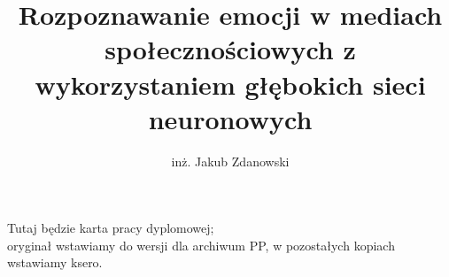 \documentclass[polish,a4paper,oneside]{ppfcmthesis}
\author{%
   inż. Jakub Zdanowski \album{127239}
}
\title{Rozpoznawanie emocji w mediach społecznościowych z wykorzystaniem głębokich sieci neuronowych}
\begin{document}
\frontmatter\pagestyle{empty}%
\maketitle\cleardoublepage%


\thispagestyle{empty}\vspace*{\fill}%
\begin{center}Tutaj będzie karta pracy dyplomowej;\\oryginał wstawiamy do wersji dla archiwum PP, w pozostałych kopiach wstawiamy ksero.\end{center}%
\vfill\cleardoublepage%


\pagestyle{ppfcmthesis}%
\tableofcontents* 
\cleardoublepage %


\mainmatter%









{\raggedright\sloppy\small}


% 


\ppcolophon
\end{document}
